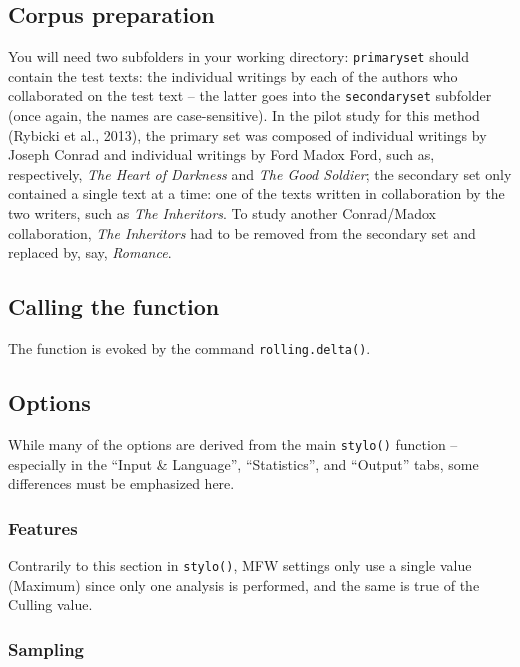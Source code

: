 \documentclass[11pt,a4paper]{article}
\def\underscore{\raisebox{-.8ex}{-}}
\def\code#1{{\tt #1}}
\begin{document}
\subsection{Corpus preparation}

You will need two subfolders in your working directory: \code{primary\underscore{}set}
should contain the test texts: the individual writings by each of
the authors who collaborated on the test text -- the latter goes into
the \code{secondary\underscore{}set} subfolder (once again, the names are case-sensitive).
In the pilot study for this method (Rybicki et al., 2013), the primary
set was composed of individual writings by Joseph Conrad and individual
writings by Ford Madox Ford, such as, respectively, \emph{The Heart
of Darkness} and \emph{The Good Soldier}; the secondary set only contained
a single text at a time: one of the texts written in collaboration
by the two writers, such as \emph{The Inheritors}. To study another
Conrad/Madox collaboration, \emph{The Inheritors} had to be removed
from the secondary set and replaced by, say, \emph{Romance}.


\subsection{Calling the function}

The function is evoked by the command \code{rolling.delta()}.


\subsection{Options}

While many of the options are derived from the main \code{stylo()} function
-- especially in the ``Input \& Language'', ``Statistics'', and
``Output'' tabs, some differences must be emphasized here.


\subsubsection{Features}

Contrarily to this section in \code{stylo()}, MFW settings only
use a single value (Maximum) since only one analysis is performed,
and the same is true of the Culling value.


\subsubsection{Sampling}
\end{document}
